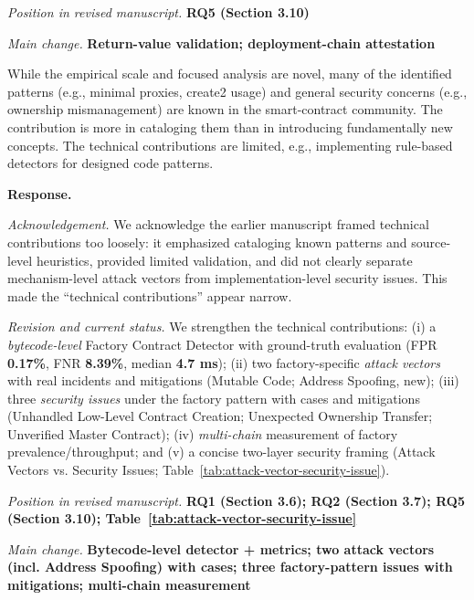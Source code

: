 \documentclass[acmsmall]{acmart}
\begin{document}
	\textit{Position in revised manuscript.} {\color{red}\textbf{RQ5 (Section 3.10)}}

	\textit{Main change.}
	{\color{blue}\textbf{Return-value validation; deployment-chain attestation}}

	\begin{tcolorbox}
		[commentbox,title=Reviewer \#4 -- Comment 4] While the empirical scale and focused analysis are
		novel, many of the identified patterns (e.g., minimal proxies, create2 usage) and general security
		concerns (e.g., ownership mismanagement) are known in the smart-contract community. The
		contribution is more in cataloging them than in introducing fundamentally new concepts. The technical
		contributions are limited, e.g., implementing rule-based detectors for designed code
		patterns.
	\end{tcolorbox}

	\noindent
	\textbf{Response.}

	\textit{Acknowledgement.} We acknowledge the earlier manuscript framed technical contributions too
	loosely: it emphasized cataloging known patterns and source-level heuristics, provided limited validation,
	and did not clearly separate mechanism-level attack vectors from implementation-level security
	issues. This made the “technical contributions” appear narrow.

	\textit{Revision and current status.} We strengthen the technical contributions: (i) a \emph{bytecode-level}
	Factory Contract Detector with ground-truth evaluation (FPR \textbf{0.17\%}, FNR \textbf{8.39\%},
	median \textbf{4.7 ms}); (ii) two factory-specific \emph{attack vectors} with real incidents and
	mitigations (Mutable Code; Address Spoofing, new); (iii) three \emph{security issues} under the factory
	pattern with cases and mitigations (Unhandled Low-Level Contract Creation; Unexpected Ownership Transfer;
	Unverified Master Contract); (iv) \emph{multi-chain} measurement of factory prevalence/throughput;
	and (v) a concise two-layer security framing (Attack Vectors vs. Security Issues; Table~\ref{tab:attack-vector-security-issue}).

	\textit{Position in revised manuscript.} {\color{red}\textbf{RQ1 (Section 3.6); RQ2 (Section 3.7); RQ5 (Section 3.10); Table~\ref{tab:attack-vector-security-issue}}}

	\textit{Main change.} {\color{blue}\textbf{Bytecode-level detector + metrics; two attack vectors (incl. Address Spoofing) with cases; three factory-pattern issues with mitigations; multi-chain measurement}}
\end{document}
